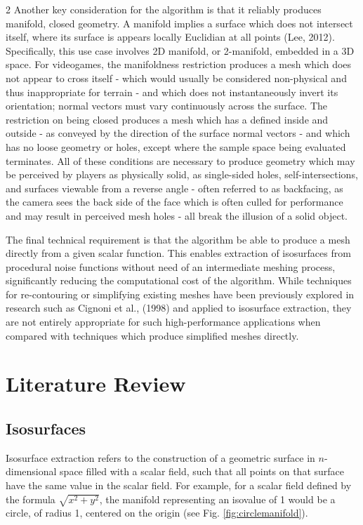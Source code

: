 \documentclass[]{article}
\begin{document}
\begin{multicols}{2}
Another key consideration for the algorithm is that it reliably produces manifold, closed geometry. A manifold implies a surface which does not intersect itself, where its surface is appears locally Euclidian at all points (Lee, 2012). Specifically, this use case involves 2D manifold, or 2-manifold, embedded in a 3D space. For videogames, the manifoldness restriction produces a mesh which does not appear to cross itself - which would usually be considered non-physical and thus inappropriate for terrain - and which does not instantaneously invert its orientation; normal vectors must vary continuously across the surface. The restriction on being closed produces a mesh which has a defined inside and outside - as conveyed by the direction of the surface normal vectors - and which has no loose geometry or holes, except where the sample space being evaluated terminates. All of these conditions are necessary to produce geometry which may be perceived by players as physically solid, as single-sided holes, self-intersections, and surfaces viewable from a reverse angle - often referred to as \textquotesingle backfacing\textquotesingle, as the camera sees the back side of the face which is often culled for performance and may result in perceived mesh holes - all break the illusion of a solid object.

The final technical requirement is that the algorithm be able to produce a mesh directly from a given scalar function. This enables extraction of isosurfaces from procedural noise functions without need of an intermediate meshing process, significantly reducing the computational cost of the algorithm. While techniques for re-contouring or simplifying existing meshes have been previously explored in research such as Cignoni et al., (1998) and applied to isosurface extraction, they are not entirely appropriate for such high-performance applications when compared with techniques which produce simplified meshes directly.

\section{Literature Review}\label{literature-review}

\subsection{Isosurfaces}\label{isosurfaces}

Isosurface extraction refers to the construction of a geometric surface in $n$-dimensional space filled with a scalar field, such that all points on that surface have the same value in the scalar field. For example, for a scalar field defined by the formula $\sqrt{x^2 + y^2}$, the manifold representing an isovalue of 1 would be a circle, of radius 1, centered on the origin (see Fig. \ref{fig:circlemanifold}).


\end{multicols}
\end{document}
